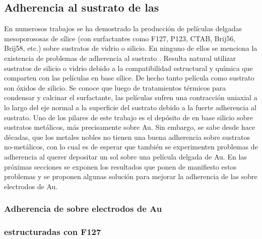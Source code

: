 	\subsection{Adherencia al sustrato de las \pdm}	

		 En numerosos trabajos se ha demostrado la producción de películas delgadas mesoporososas de sílice (con surfactantes como F127, P123, CTAB, Brij56, Brij58, etc.) sobre sustratos de vidrio o silicio. En ninguno de ellos se menciona la existencia de problemas de adherencia al sustrato \cite{Angelome2008,Fuertes2010,Violi2015}. Resulta natural utilizar sustratos de silicio o vidrio debido a la compatibilidad estructural y química que comparten con las películas en base sílice. De hecho tanto película como sustrato son óxidos de silicio. Se conoce que luego de tratamientos térmicos para condensar y calcinar el surfactante, las películas sufren una contracción uniaxial a lo largo del eje normal a la superficie del sustrato debido a la fuerte adherencia al sustrato.\cite{Grosso2004,Soler-Illia2012,Chougnet2005} Uno de los pilares de este trabajo es el depósito de \pdm\space en base silicio sobre sustratos metálicos, más precisamente sobre Au. Sin embargo, se sabe desde hace décadas, que los metales nobles no tienen una buena adherencia sobre sustratos no-metálicos\cite{Kern1990,Hieber1976}, con lo cual es de esperar que también se experimenten problemas de adherencia al querer depositar un sol sobre una película delgada de Au. \cite{Meyer2004,Nugen2009,nasa1973} En las próximas secciones se exponen los resultados que ponen de manifiesto estos problemas y se proponen algunas solución para mejorar la adherencia de las \pdm\space sobre electrodos de Au.

		\subsubsection{Adherencia de \pdm\space sobre electrodos de Au}

			\subsubsection*{\pdm\space estructuradas con F127}

